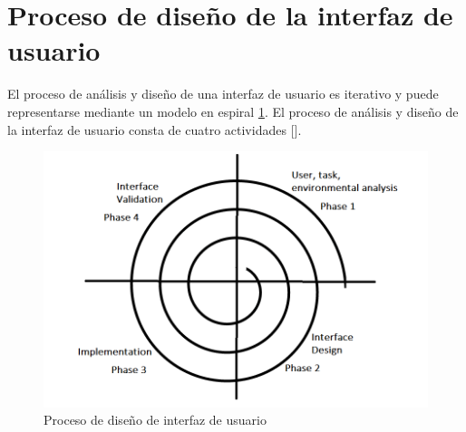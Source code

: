 \section{Proceso de diseño de la interfaz de usuario}
El proceso de análisis y diseño de una interfaz de usuario es iterativo y puede representarse mediante un modelo en espiral \ref{fig:espiral}. El proceso de análisis y diseño de la interfaz de usuario consta de cuatro actividades [\cite{36,37}].

\begin{figure}[h]
\centering
\includegraphics[scale=0.3]{Graphics/espiral}
\caption{Proceso de diseño de interfaz de usuario}
\label{fig:espiral}
\end{figure}

